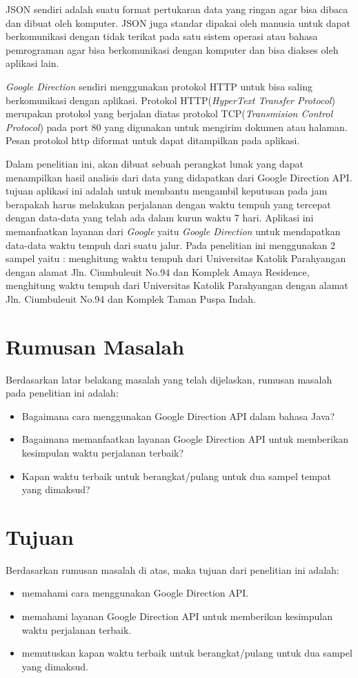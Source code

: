 JSON sendiri adalah suatu format pertukaran data yang  ringan agar bisa dibaca dan dibuat oleh komputer. JSON juga standar dipakai oleh manusia untuk dapat berkomunikasi dengan tidak terikat pada satu sistem operasi atau bahasa pemrograman agar bisa berkomunikasi dengan komputer dan bisa diakses oleh aplikasi lain.

\textit{Google Direction} sendiri menggunakan protokol HTTP untuk bisa saling berkomunikasi dengan aplikasi. Protokol HTTP(\textit{HyperText Transfer Protocol}) merupakan protokol yang berjalan diatas protokol TCP(\textit{Transmision Control Protocol}) pada port 80 yang digunakan untuk mengirim dokumen atau halaman. Pesan protokol http diformat untuk dapat ditampilkan pada aplikasi.

Dalam penelitian ini, akan dibuat sebuah perangkat lunak yang dapat menampilkan hasil analisis dari data yang didapatkan dari Google Direction API. tujuan aplikasi ini adalah untuk membantu mengambil keputusan pada jam berapakah harus melakukan perjalanan dengan waktu tempuh yang tercepat dengan data-data yang telah ada dalam kurun waktu 7 hari. Aplikasi ini memanfaatkan layanan dari \textit{Google} yaitu \textit{Google Direction} untuk mendapatkan data-data waktu tempuh dari suatu jalur. Pada penelitian ini menggunakan 2 sampel yaitu : menghitung waktu tempuh dari Universitas Katolik Parahyangan dengan alamat Jln. Ciumbuleuit No.94 dan Komplek Amaya Residence, menghitung waktu tempuh dari Universitas Katolik Parahyangan dengan alamat Jln. Ciumbuleuit No.94 dan Komplek Taman Puspa Indah.

\section{Rumusan Masalah}
\label{sec:rumusan}
Berdasarkan latar belakang masalah yang telah dijelaskan, rumusan masalah pada penelitian ini adalah:
\begin{itemize}
	\item Bagaimana cara menggunakan Google Direction API dalam bahasa Java?
	\item Bagaimana memanfaatkan layanan Google Direction API untuk memberikan kesimpulan waktu perjalanan terbaik?
	\item Kapan waktu terbaik untuk berangkat/pulang untuk dua sampel tempat yang dimaksud?
\end{itemize}

\section{Tujuan}
\label{sec:tujuan}
Berdasarkan rumusan masalah di atas, maka tujuan dari penelitian ini adalah:
\begin{itemize}
	\item memahami cara menggunakan Google Direction API.
	\item memahami layanan Google Direction API untuk memberikan kesimpulan waktu perjalanan terbaik.
	\item memutuskan kapan waktu terbaik untuk berangkat/pulang untuk dua sampel yang dimaksud.
\end{itemize}

